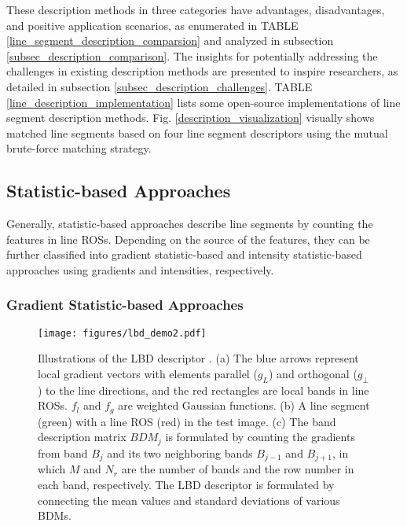 \documentclass[journal,compsoc]{IEEEtran}
\begin{document}
These description methods in three categories have advantages, disadvantages, and positive application scenarios, as enumerated in TABLE \ref{line_segment_description_comparsion} and analyzed in subsection \ref{subsec_description_comparison}. The insights for potentially addressing the challenges in existing description methods are presented to inspire researchers, as detailed in subsection \ref{subsec_description_challenges}. TABLE \ref{line_description_implementation} lists some open-source implementations of line segment description methods. Fig. \ref{description_visualization} visually shows matched line segments based on four line segment descriptors using the mutual brute-force matching strategy.



\subsection{Statistic-based Approaches}
\label{subsec_description_statistic}

Generally, statistic-based approaches describe line segments by counting the features in line ROSs. Depending on the source of the features, they can be further classified into gradient statistic-based and intensity statistic-based approaches using gradients and intensities, respectively.

\subsubsection{Gradient Statistic-based Approaches}
\label{subsec_description_statistic_gradient}

\begin{figure}[tbp]
	\centering
	\texttt{[image: figures/lbd\_demo2.pdf]}
	\caption{Illustrations of the LBD descriptor \cite{LBD}. (a) The blue arrows represent local gradient vectors with elements parallel ($g_L$) and orthogonal ($g_\bot$) to the line directions, and the red rectangles are local bands in line ROSs. $f_l$ and $f_g$ are weighted Gaussian functions. (b) A line segment (green) with a line ROS (red) in the test image. (c) The band description matrix $BDM_j$ is formulated by counting the gradients from band $B_j$ and its two neighboring bands $B_{j-1}$ and $B_{j+1}$, in which $M$ and $N_r$ are the number of bands and the row number in each band, respectively. The LBD descriptor is formulated by connecting the mean values and standard deviations of various BDMs.}
	\label{lbd_demo}
\end{figure}
\end{document}
